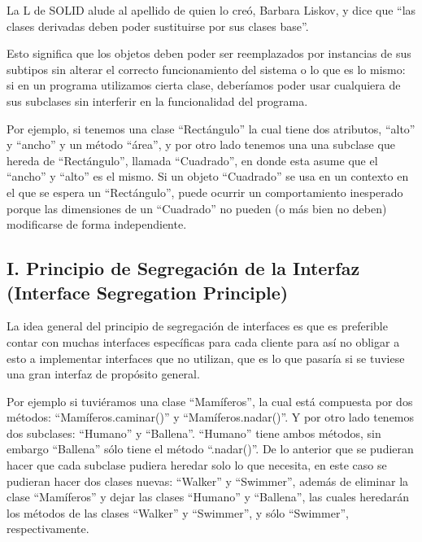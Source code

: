 \documentclass[12pt, oneside]{article}
\begin{document}
\cite{martin2000design}

La L de SOLID alude al apellido de quien lo creó, Barbara Liskov, y dice que “las clases derivadas deben poder sustituirse por sus clases base”\cite{solid_esp}.

Esto significa que los objetos deben poder ser reemplazados por instancias de sus subtipos sin alterar el correcto funcionamiento del sistema o lo que es lo mismo: si en un programa utilizamos cierta clase, deberíamos poder usar cualquiera de sus subclases sin interferir en la funcionalidad del programa. 

Por ejemplo, si tenemos una clase ``Rectángulo'' la cual tiene dos atributos, ``alto'' y ``ancho'' y un método ``área'', y por otro lado tenemos una una subclase que hereda de ``Rectángulo'', llamada ``Cuadrado'', en donde esta asume que el ``ancho'' y ``alto'' es el mismo. Si un objeto ``Cuadrado'' se usa en un contexto en el que se espera un ``Rectángulo'', puede ocurrir un comportamiento inesperado porque las dimensiones de un ``Cuadrado'' no pueden (o más bien no deben) modificarse de forma independiente. 

\subsection*{I. Principio de Segregación de la Interfaz (Interface Segregation Principle)}

\cite{martin2000design}

La idea general del principio de segregación de interfaces es que es preferible contar con muchas interfaces específicas para cada cliente para así no obligar a esto a implementar interfaces que no utilizan, que es lo que pasaría si se tuviese una gran interfaz de propósito general.

Por ejemplo si tuviéramos una clase ``Mamíferos'', la cual está compuesta por dos métodos: ``Mamíferos.caminar()'' y ``Mamíferos.nadar()''. Y por otro lado tenemos dos subclases: ``Humano'' y ``Ballena''. ``Humano'' tiene ambos métodos, sin embargo ``Ballena'' sólo tiene el método ``.nadar()''.
De lo anterior que se pudieran hacer que cada subclase pudiera heredar solo lo que necesita, en este caso se pudieran hacer dos clases nuevas: ``Walker'' y ``Swimmer'', además de eliminar la clase ``Mamíferos'' y dejar las clases ``Humano'' y ``Ballena'', las cuales heredarán los métodos de las clases ``Walker'' y ``Swimmer'', y sólo ``Swimmer'', respectivamente.
\end{document}
